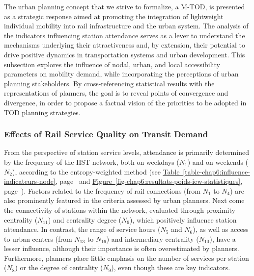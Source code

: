 \begin{refsegment}
The urban planning concept that we strive to formalize, a \acrfull{M-TOD}, is presented as a strategic response aimed at promoting the integration of lightweight individual mobility into rail infrastructure and the urban system. The analysis of the indicators influencing station attendance serves as a lever to understand the mechanisms underlying their attractiveness and, by extension, their potential to drive positive dynamics in transportation systems and urban development. This subsection explores the influence of nodal, urban, and local accessibility parameters on mobility demand, while incorporating the perceptions of urban planning stakeholders. By cross-referencing statistical results with the representations of planners, the goal is to reveal points of convergence and divergence, in order to propose a factual vision of the priorities to be adopted in \acrshort{TOD} planning strategies.%

\subsubsection*{Effects of Rail Service Quality on Transit Demand
    \label{chap6:results-influence-indicateurs-node}
    }

From the perspective of station service levels, attendance is primarily determined by the frequency of the \acrshort{HST} network, both on weekdays (\(N_{1}\)) and on weekends (\(N_{2}\)), according to the entropy-weighted method (see \hyperref[table-chap6:influence-indicateurs-node]{Table~\ref{table-chap6:influence-indicateurs-node}}, page~\pageref{table-chap6:influence-indicateurs-node} and \hyperref[fig-chap6:resultats-poids-iew-statistiques]{Figure~\ref{fig-chap6:resultats-poids-iew-statistiques}}, page~\pageref{fig-chap6:resultats-poids-iew-statistiques}). Factors related to the frequency of rail connections (from \(N_{1}\) to \(N_{4}\)) are also prominently featured in the criteria assessed by urban planners. Next come the connectivity of stations within the network, evaluated through proximity centrality (\(N_{11}\)) and centrality degree (\(N_{9}\)), which positively influence station attendance. In contrast, the range of service hours (\(N_{5}\) and \(N_{6}\)), as well as access to urban centers (from \(N_{13}\) to \(N_{16}\)) and intermediary centrality (\(N_{10}\)), have a lesser influence, although their importance is often overestimated by planners. Furthermore, planners place little emphasis on the number of services per station (\(N_{8}\)) or the degree of centrality (\(N_{9}\)), even though these are key indicators.%


\end{refsegment}
